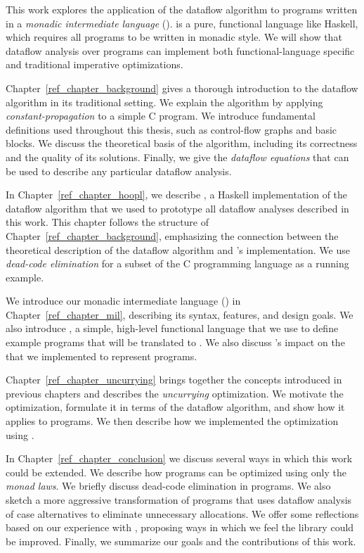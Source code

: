 This work explores the application of the dataflow algorithm to
programs written in a \emph{monadic intermediate language}
(\mil). \Mil is a pure, functional language like Haskell, which 
requires all programs to be written in monadic style.  We will show
that dataflow analysis over \mil programs can implement both
functional-language specific and traditional imperative optimizations.

 Chapter~\ref{ref_chapter_background}  gives 
a thorough introduction to the dataflow algorithm in its traditional
setting. We explain the algorithm by
applying \emph{constant-propagation} to a simple C program. We
introduce fundamental definitions used throughout this thesis, such as
control-flow graphs and basic blocks. We discuss the theoretical basis
of the algorithm, including its correctness and the quality of its
solutions. Finally, we give the \emph{dataflow equations} that can be
used to describe any particular dataflow analysis.

 In Chapter~\ref{ref_chapter_hoopl},
we describe \hoopl \citep{Hoopl-3.8.7.0}, a Haskell implementation of
the dataflow algorithm that we used to prototype all dataflow analyses
described in this work. This chapter follows the structure of
Chapter~\ref{ref_chapter_background}, emphasizing the connection
between the theoretical description of the dataflow algorithm
and \hoopl's implementation. We use \emph{dead-code elimination} for a
subset of the C programming language as a running example.

 We introduce our monadic 
intermediate language (\mil) in Chapter~\ref{ref_chapter_mil},
describing its syntax, features, and design goals. We also introduce
\lamC, a simple, high-level functional language that we use
to define example programs that will be translated to \mil. We also
discuss \hoopl's impact on the \ast that we implemented to
represent \mil programs.

 Chapter~\ref{ref_chapter_uncurrying} brings
together the concepts introduced in previous chapters and describes
the \emph{uncurrying} optimization. We motivate the optimization,
formulate it in terms of the dataflow algorithm, and show how it applies
to \mil programs. We then describe how we implemented the optimization
using \hoopl.

 In Chapter~\ref{ref_chapter_conclusion} we 
discuss several ways in which this work could be extended. We describe
how \mil programs can be optimized using only the \emph{monad
laws}. We briefly discuss dead-code elimination in \mil programs. We
also sketch a more aggressive transformation of \mil programs that
uses dataflow analysis of case alternatives to eliminate unnecessary
allocations. We offer some reflections based on our experience
with \hoopl, proposing ways in which we feel the library could be
improved. Finally, we summarize our goals and the contributions of
this work.


